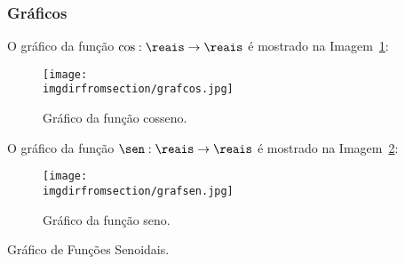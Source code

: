 \subsubsection{Gráficos}

\begin{example}
O gráfico da função $\cos : \reais \to \reais$ é mostrado na Imagem~\ref{img:grafico-cosseno}:
%
\begin{figure}[H]
\centering
\texttt{[image: \\imgdirfromsection/grafcos.jpg]}
\caption{Gráfico da função cosseno.}
\label{img:grafico-cosseno}
\end{figure}
\end{example}


\begin{example}
O gráfico da função $\sen: \reais \to \reais$ é mostrado na Imagem~\ref{img:grafico-seno}:
%
\begin{figure}[H]
\centering 
\texttt{[image: \\imgdirfromsection/grafsen.jpg]}
\caption{Gráfico da função seno.}
\label{img:grafico-seno}
\end{figure}
\end{example}

\begin{onlineact}
    {Gráfico de Funções Senoidais}.
\end{onlineact}